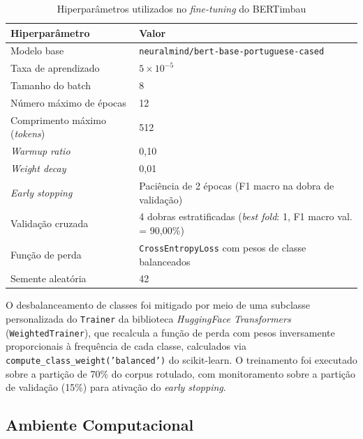 \begin{table}[!htbp]
	\caption[Hiperparâmetros do fine-tuning do BERTimbau]{Hiperparâmetros utilizados no \textit{fine-tuning} do BERTimbau}
	\label{tab:hiperparametros_bertimbau}
	\centering
	\begin{tabular}{lp{9cm}}
		\hline
		\textbf{Hiperparâmetro} & \textbf{Valor} \\
		\hline
		Modelo base                          & \texttt{neuralmind/bert-base-portuguese-cased} \\
		\hline
		Taxa de aprendizado                  & $5 \times 10^{-5}$ \\
		\hline
		Tamanho do batch                     & 8 \\ 
		\hline
		Número máximo de épocas              & 12 \\
		\hline
		Comprimento máximo (\textit{tokens}) & 512 \\
		\hline
		\textit{Warmup ratio}                & 0,10 \\
		\hline
		\textit{Weight decay}                & 0,01 \\
		\hline
		\textit{Early stopping}              & Paciência de 2 épocas (F1 macro na dobra de validação) \\
		\hline
		Validação cruzada                    & 4 dobras estratificadas (\textit{best fold}: 1, F1 macro val. = 90,00\%) \\
		\hline
		Função de perda                      & \texttt{CrossEntropyLoss} com pesos de classe balanceados \\
		\hline
		Semente aleatória                    & 42 \\
		\hline
	\end{tabular}
\end{table}


O desbalanceamento de classes foi mitigado por meio de uma subclasse personalizada do \texttt{Trainer} da biblioteca \textit{HuggingFace Transformers} \cite{wolf2020transformers} (\texttt{WeightedTrainer}), que recalcula a função de perda com pesos inversamente proporcionais à frequência de cada classe, calculados via \texttt{compute\_class\_weight('balanced')} do scikit-learn. O treinamento foi executado sobre a partição de 70\% do corpus rotulado, com monitoramento sobre a partição de validação (15\%) para ativação do \textit{early stopping}.

\subsection{Ambiente Computacional}
\label{subsec:ambiente}

